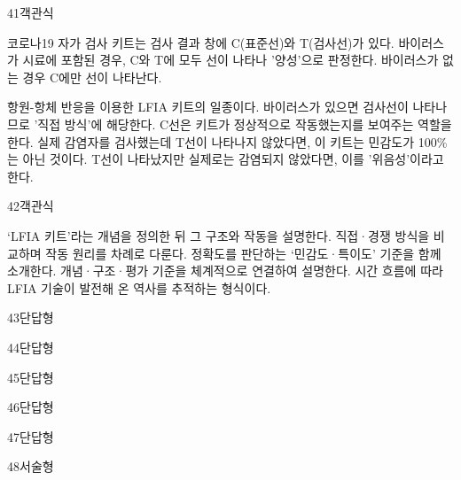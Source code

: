 \documentclass[fs9,seriesRus]{korfarm-base}
\begin{document}
\begin{kfQBlock}{41}{객관식}
\begin{kfEvidence}코로나19 자가 검사 키트는 검사 결과 창에 C(표준선)와 T(검사선)가 있다. 바이러스가 시료에 포함된 경우, C와 T에 모두 선이 나타나 '양성'으로 판정한다. 바이러스가 없는 경우 C에만 선이 나타난다.\end{kfEvidence}
\begin{kfChoices}
\kfChoice 항원-항체 반응을 이용한 LFIA 키트의 일종이다.
\kfChoice 바이러스가 있으면 검사선이 나타나므로 '직접 방식'에 해당한다.
\kfChoice C선은 키트가 정상적으로 작동했는지를 보여주는 역할을 한다.
\kfChoice 실제 감염자를 검사했는데 T선이 나타나지 않았다면, 이 키트는 민감도가 100\%는 아닌 것이다.
\kfChoice T선이 나타났지만 실제로는 감염되지 않았다면, 이를 '위음성'이라고 한다.
\end{kfChoices}
\end{kfQBlock}
\begin{kfQBlock}{42}{객관식}
\begin{kfChoices}
\kfChoice ‘LFIA 키트’라는 개념을 정의한 뒤 그 구조와 작동을 설명한다.
\kfChoice 직접·경쟁 방식을 비교하며 작동 원리를 차례로 다룬다.
\kfChoice 정확도를 판단하는 ‘민감도·특이도’ 기준을 함께 소개한다.
\kfChoice 개념·구조·평가 기준을 체계적으로 연결하여 설명한다.
\kfChoice 시간 흐름에 따라 LFIA 기술이 발전해 온 역사를 추적하는 형식이다.
\end{kfChoices}
\end{kfQBlock}
\begin{kfQBlock}{43}{단답형}
\end{kfQBlock}
\begin{kfQBlock}{44}{단답형}
\end{kfQBlock}
\begin{kfQBlock}{45}{단답형}
\end{kfQBlock}
\begin{kfQBlock}{46}{단답형}
\end{kfQBlock}
\begin{kfQBlock}{47}{단답형}
\end{kfQBlock}
\begin{kfQBlock}{48}{서술형}
\end{kfQBlock}
\kfEndMC
\end{document}
